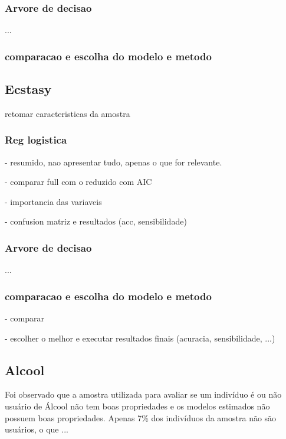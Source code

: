 \documentclass[
	article,			%
	11pt,				%
	oneside,			%
	a4paper,			%
	english,			%
	brazil,				%
	sumario=tradicional
	]{abntex2}
\begin{document}
\subsubsection{Arvore de decisao}

... 

\subsubsection{comparacao e escolha do modelo e metodo}

\subsection{Ecstasy}

retomar caracteristicas da amostra

\subsubsection{Reg logistica}

- resumido, nao apresentar tudo, apenas o que for relevante.

- comparar full com o reduzido com AIC

- importancia das variaveis

- confusion matriz e resultados (acc, sensibilidade)

\subsubsection{Arvore de decisao}

... 

\subsubsection{comparacao e escolha do modelo e metodo}

- comparar

- escolher o melhor e executar resultados finais (acuracia, sensibilidade, ...)

\subsection{Alcool}

Foi observado que a amostra utilizada para avaliar se um indivíduo é ou não usuário de Álcool não tem boas propriedades e os modelos estimados não possuem boas propriedades. Apenas 7\% dos indivíduos da amostra não são usuários, o que ...
\end{document}
